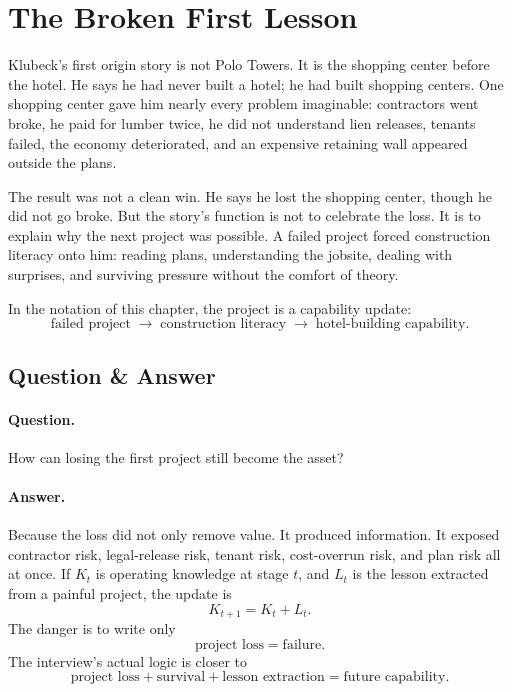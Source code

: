 \section{The Broken First Lesson}

Klubeck's first origin story is not Polo Towers. It is the shopping center before the hotel. He says he had never built a hotel; he had built shopping centers. One shopping center gave him nearly every problem imaginable: contractors went broke, he paid for lumber twice, he did not understand lien releases, tenants failed, the economy deteriorated, and an expensive retaining wall appeared outside the plans.

The result was not a clean win. He says he lost the shopping center, though he did not go broke. But the story's function is not to celebrate the loss. It is to explain why the next project was possible. A failed project forced construction literacy onto him: reading plans, understanding the jobsite, dealing with surprises, and surviving pressure without the comfort of theory.

In the notation of this chapter, the project is a capability update:
\begin{equation}
\text{failed project}
\;\longrightarrow\;
\text{construction literacy}
\;\longrightarrow\;
\text{hotel-building capability}.
\end{equation}

\subsection{Question \& Answer}

\paragraph{Question.}
How can losing the first project still become the asset?

\paragraph{Answer.}
Because the loss did not only remove value. It produced information. It exposed contractor risk, legal-release risk, tenant risk, cost-overrun risk, and plan risk all at once. If \(K_t\) is operating knowledge at stage \(t\), and \(L_t\) is the lesson extracted from a painful project, the update is
\begin{equation}
K_{t+1}=K_t+L_t.
\end{equation}
The danger is to write only
\begin{equation}
\text{project loss}=\text{failure}.
\end{equation}
The interview's actual logic is closer to
\begin{equation}
\text{project loss}
+
\text{survival}
+
\text{lesson extraction}
=
\text{future capability}.
\end{equation}

